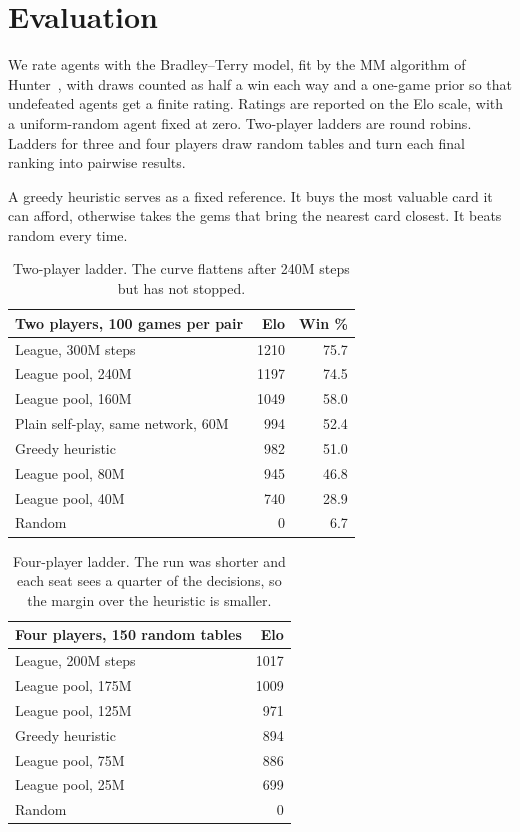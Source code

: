 \documentclass[11pt]{article}
\begin{document}
\section{Evaluation}
We rate agents with the Bradley--Terry model, fit by the MM algorithm of
Hunter~\cite{hunter2004}, with draws counted as half a win each way and a one-game prior so
that undefeated agents get a finite rating. Ratings are reported on the Elo scale, with a
uniform-random agent fixed at zero. Two-player ladders are round robins. Ladders for three
and four players draw random tables and turn each final ranking into pairwise results.

A greedy heuristic serves as a fixed reference. It buys the most valuable card it can afford,
otherwise takes the gems that bring the nearest card closest. It beats random every time.

\begin{table}[h]
\centering
\begin{tabular}{lrr}
\toprule
Two players, 100 games per pair & Elo & Win \% \\
\midrule
League, 300M steps & 1210 & 75.7 \\
League pool, 240M & 1197 & 74.5 \\
League pool, 160M & 1049 & 58.0 \\
Plain self-play, same network, 60M & 994 & 52.4 \\
Greedy heuristic & 982 & 51.0 \\
League pool, 80M & 945 & 46.8 \\
League pool, 40M & 740 & 28.9 \\
Random & 0 & 6.7 \\
\bottomrule
\end{tabular}
\caption{Two-player ladder. The curve flattens after 240M steps but has not stopped.}
\end{table}

\begin{table}[h]
\centering
\begin{tabular}{lr}
\toprule
Four players, 150 random tables & Elo \\
\midrule
League, 200M steps & 1017 \\
League pool, 175M & 1009 \\
League pool, 125M & 971 \\
Greedy heuristic & 894 \\
League pool, 75M & 886 \\
League pool, 25M & 699 \\
Random & 0 \\
\bottomrule
\end{tabular}
\caption{Four-player ladder. The run was shorter and each seat sees a quarter of the
decisions, so the margin over the heuristic is smaller.}
\end{table}
\end{document}
